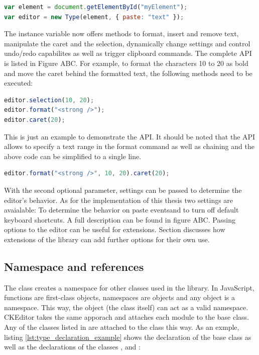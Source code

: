 \begin{lstlisting}[language=JavaScript, caption=Type instantiation, label=lst:type_instantiation]
var element = document.getElementById("myElement");
var editor = new Type(element, { paste: "text" });
\end{lstlisting}

The  instance variable now offers methods to format, insert and remove text, manipulate the caret and the selection, dynamically change settings and control undo/redo capabilites as well as trigger clipboard commands. The complete API is listed in Figure ABC. For example, to format the characters 10 to 20 as bold and move the caret behind the formatted text, the following methods need to be executed:

\begin{lstlisting}[language=JavaScript, caption=Example commands to format text, label=lst:type_format_example]
editor.selection(10, 20);
editor.format("<strong />");
editor.caret(20);
\end{lstlisting}

\noindent This is just an example to demonstrate the API. It should be noted that the API allows to specify a text range in the format command as well as chaining and the above code can be simplified to a single line.

\begin{lstlisting}[language=JavaScript, caption=Example chaining, label=lst:type_chaining_example]
editor.format("<strong />", 10, 20).caret(20);
\end{lstlisting}

With the second optional parameter, settings can be passed to determine the editor's behavior. As for the implementation of this thesis two settings are avaialable: To determine the behavior on paste eventsand to turn off default keyboard shortcuts. A full description can be found in figure ABC. Passing options to the editor can be useful for extensions. Section  discusses how extensions of the library can add further options for their own use.

\subsection{Namespace and references} 
\label{subsec:namespace_and_refs}

The  class creates a namespace for other classes used in the library. In JavaScript, functions are first-class objects, namespaces are objects and any object is a namespace. This way, the   object (the class itself) can act as a valid namespace. CKEditor takes the same apporach and attaches each module to the  base class. Any of the classes listed in  are attached to the  class this way. As an exmple, listing \ref{lst:type_declaration_example} shows the declaration of the  base class as well as the declarations of the classes ,  and :

